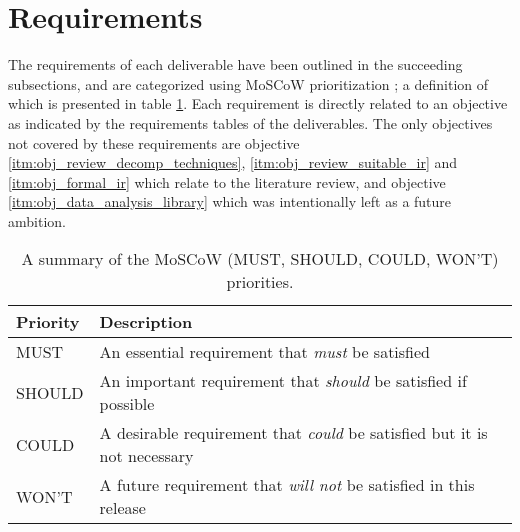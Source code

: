 

\section{Requirements}
\label{sec:requirements}

The requirements of each deliverable have been outlined in the succeeding subsections, and are categorized using MoSCoW prioritization \cite{MoSCoW_analysis}; a definition of which is presented in table \ref{tbl:MoSCoW_priorities}. Each requirement is directly related to an objective as indicated by the requirements tables of the deliverables. The only objectives not covered by these requirements are objective \ref{itm:obj_review_decomp_techniques}, \ref{itm:obj_review_suitable_ir} and \ref{itm:obj_formal_ir} which relate to the literature review, and objective \ref{itm:obj_data_analysis_library} which was intentionally left as a future ambition.

\begin{table}[htbp]
	\begin{center}
		\begin{tabular}{|l|l|}
			\hline
			Priority & Description \\
			\hline
			MUST & An essential requirement that \textit{must} be satisfied \\
			SHOULD & An important requirement that \textit{should} be satisfied if possible \\
			COULD & A desirable requirement that \textit{could} be satisfied but it is not necessary \\
			WON'T & A future requirement that \textit{will not} be satisfied in this release \\
			\hline
		\end{tabular}
	\end{center}
	\caption{A summary of the MoSCoW (MUST, SHOULD, COULD, WON'T) priorities.}
	\label{tbl:MoSCoW_priorities}
\end{table}





